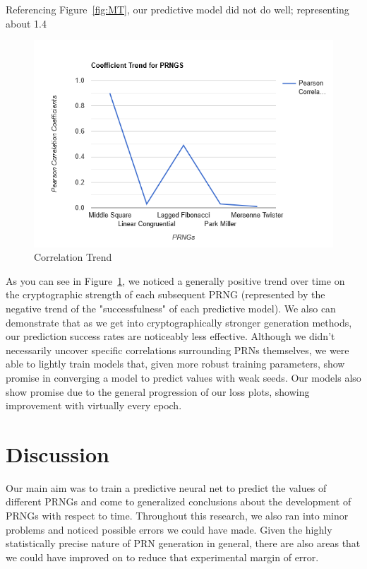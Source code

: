 \documentclass[conference]{IEEEtran}
\begin{document}
Referencing Figure~\ref{fig:MT}, our predictive model did not do well; representing about 1.4%

\begin{figure}[H]
\centering
\includegraphics[width=1\linewidth]{./Images/cotrend.png}
\caption{Correlation Trend}
\label{fig:Correlation Trend}
\end{figure}
As you can see in Figure~\ref{fig:Correlation Trend}, we noticed a generally positive trend over time on the cryptographic strength of each subsequent PRNG (represented by the negative trend of the "successfulness" of each predictive model). We also can demonstrate that as we get into cryptographically stronger generation methods, our prediction success rates are noticeably less effective. Although we didn't necessarily uncover specific correlations surrounding PRNs themselves, we were able to lightly train models that, given more robust training parameters, show promise in converging a model to predict values with weak seeds. Our models also show promise due to the general progression of our loss plots, showing improvement with virtually every epoch.

\section{Discussion}
Our main aim was to train a predictive neural net to predict the values of different PRNGs and come to generalized conclusions about the development of PRNGs with respect to time.
Throughout this research, we also ran into minor problems and noticed possible errors we could have made. Given the highly statistically precise nature of PRN generation in general, there are also areas that we could have improved on to reduce that experimental margin of error.
\end{document}
